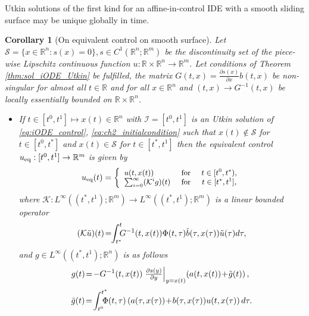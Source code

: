 \documentclass{article}
\newcommand{\R}{\mathbb{R}}
\newtheorem{corollary}{Corollary}
\begin{document}
{Utkin solutions of the first kind for an affine-in-control IDE with a smooth sliding surface may be unique globally in time.}

	\begin{corollary}[On equivalent control on smooth surface]\itshape\label{eq:uniq_Utkin_IDE}
		Let $\mathcal{S}=\{x\in \R^{n}:s(x)=0\}, s\in C^1(\R^n;\R^m)$ be the discontinuity  set of
		the piece-wise  Lipschitz continuous function $u:\R\times \R^n\to \R^m$. Let conditions of  Theorem \ref{thm:sol_iODE_Utkin} be fulfilled, the matrix $G(t,x)=\frac{\partial s(x)}{\partial x}b(t,x)$ be non-singular for almost all $t\in \R$ and for all $x\in \R^n$ and $(t,x)\to G^{-1}(t,x)$ be locally essentially bounded on $\R\times \R^{n}$.\vspace{-1mm}
		\begin{itemize}
		\item[i)]  If $t\in [t^0,t^1] \mapsto x(t)\in \R^n$ with $\mathcal{I}=[t^0,t^1]$ is an Utkin solution of  \eqref{eq:iODE_control}, \eqref{eq:ch2_initialcondition}  such that $x(t)\notin \mathcal{S}$ for $t\in [t^0,t^*]$ and $x(t)\in \mathcal{S}$ for $t\in[t^*,t^1]$ then the equivalent control $u_{\rm eq}:[t^0,t^1]\to \R^m$  is given by \vspace{-1mm}
		\begin{equation}\small
		u_{\rm eq}(t) =\left\{
		\begin{array}{lcc}
			u(t,x(t)) & \text{ for } & t\in[t^0,t^*),\\
			\sum^{\infty}_{i=0}(\mathcal{K}^{i}g)(t) & \text{ for } & t\in[ t^*,t^1],
			\end{array}
		\right.\vspace{-1mm}
		\end{equation}
	where  $\mathcal{K}:L^{\infty}((t^*,t^1);\R^m)\to L^{\infty}((t^*,t^1);\R^m) $ is a linear bounded operator \vspace{-1mm}
	\begin{equation}\small 
	(\mathcal{K}\tilde u)(t)\!=\!\!\int^t_{t^*}\!\!\!G^{-1}(t,x(t))\Phi(t,\tau) \tilde b(\tau,x(\tau)) \tilde u(\tau) d\tau,\vspace{-1mm}
	\end{equation}
	and $g\!\in\! L^{\infty}((t^*,t^1);\R^n)$ is as follows\vspace{-1mm}
					\begin{equation*}\small 
			\!\!g(t)\!=\!- G^{-1}(t,x(t))\left.\tfrac{\partial s(y)}{\partial y}\right|_{y=x(t)} \!\left(a(t,x(t))\!+\!\tilde g(t)\right),\vspace{-2mm}
		\end{equation*}
	\begin{equation*}\small 
			\tilde g(t)\!=\!\int^{t^*}_{t^0}\!\!\!\!\!\Phi(t,\tau) \left(a(\tau,x(\tau)) \!+\!b(\tau,x(\tau)) u(t,x(\tau)\right) d \tau.\vspace{-1mm}
	\end{equation*}
			

\end{itemize}
\end{corollary}
\end{document}
